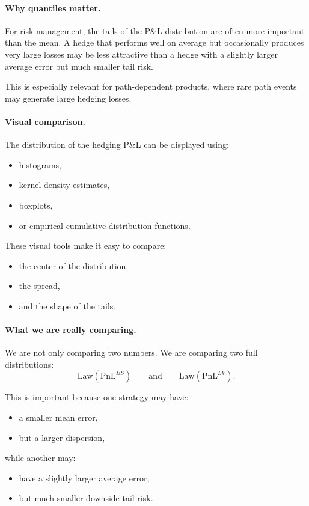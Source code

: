 \documentclass[11pt]{article}
\theoremstyle{plain}
\theoremstyle{definition}
\theoremstyle{remark}
\begin{document}
\paragraph{Why quantiles matter.}
For risk management, the tails of the P\&L distribution are often more
important than the mean.
A hedge that performs well on average but occasionally produces very
large losses may be less attractive than a hedge with a slightly larger
average error but much smaller tail risk.

This is especially relevant for path-dependent products, where rare path
events may generate large hedging losses.

\paragraph{Visual comparison.}
The distribution of the hedging P\&L can be displayed using:
\begin{itemize}[leftmargin=1.4em]
    \item histograms,
    \item kernel density estimates,
    \item boxplots,
    \item or empirical cumulative distribution functions.
\end{itemize}

These visual tools make it easy to compare:
\begin{itemize}[leftmargin=1.4em]
    \item the center of the distribution,
    \item the spread,
    \item and the shape of the tails.
\end{itemize}

\paragraph{What we are really comparing.}
We are not only comparing two numbers.
We are comparing two full distributions:
\[
\mathrm{Law}(\mathrm{PnL}^{BS})
\qquad\text{and}\qquad
\mathrm{Law}(\mathrm{PnL}^{LV}).
\]

This is important because one strategy may have:
\begin{itemize}[leftmargin=1.4em]
    \item a smaller mean error,
    \item but a larger dispersion,
\end{itemize}
while another may:
\begin{itemize}[leftmargin=1.4em]
    \item have a slightly larger average error,
    \item but much smaller downside tail risk.
\end{itemize}
\end{document}
